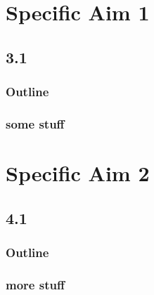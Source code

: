 \section{Specific Aim 1}
 \subsection{3.1}
\begin{frame}
\frametitle{Outline}
\tableofcontents[currentsection]
\end{frame}
       
   
    \begin{frame}
        \frametitle{some stuff}
    \end{frame}
    
    
\section{Specific Aim 2}
 \subsection{4.1}
\begin{frame}
\frametitle{Outline}
\tableofcontents[currentsection]
\end{frame}
       
  
    \begin{frame}
        \frametitle{more stuff}
    \end{frame}

     




